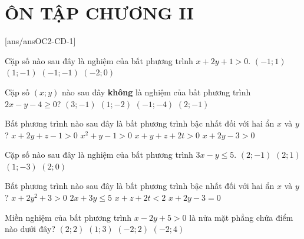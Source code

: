\section*{ÔN TẬP CHƯƠNG II}
\setcounter{ex}{0}\setcounter{bt}{0}
[ans/ansOC2-CD-1]

\begin{ex}%
    Cặp số nào sau đây là nghiệm của bất phương trình $x+2y+1>0$.
    \choice
    {\True $(-1; 1)$}
    {$(1; -1)$}
    {$(-1; -1)$}
    {$(-2; 0)$}
\end{ex}
\begin{ex}%
    Cặp số $(x;y)$ nào sau đây \textbf{không} là nghiệm của bất phương trình $2x-y-4 \geq 0$?
    \choice
    {$(3;-1)$}
    {$(1;-2)$}
    {\True $(-1;-4)$}
    {$(2;-1)$}
\end{ex}
\begin{ex}%
    Bất phương trình nào sau đây là bất phương trình bậc nhất đối với hai ẩn $x$ và $y$?
    \choice
    {$x+2y+z-1>0$}
    {$x^2+y-1>0$}
    {$x+y+z+2t>0$}
    {\True $x+2y-3>0$}
\end{ex}
\begin{ex}%
    Cặp số nào sau đây là nghiệm của bất phương trình $3x-y \leq 5$.
    \choice
    {$(2;-1)$}
    {\True $(2; 1)$}
    {$(1; -3)$}
    {$(2; 0)$}
\end{ex}
\begin{ex}%
    Bất phương trình nào sau đây là bất phương trình bậc nhất đối với hai ẩn $x$ và $y$?
    \choice
    {$x+2y^2+3>0$}
    {\True $2x+3y \leq 5$}
    {$x+z+2t<2$}
    {$x+2y-3=0$}
\end{ex}
\begin{ex}%
    Miền nghiệm của bất phương trình $x-2y+5>0$ là nửa mặt phẳng chứa điểm nào dưới đây?
    \choice
    {\True $(2;2)$}
    {$(1;3)$}
    {$(-2;2)$}
    {$(-2;4)$}
\end{ex}
